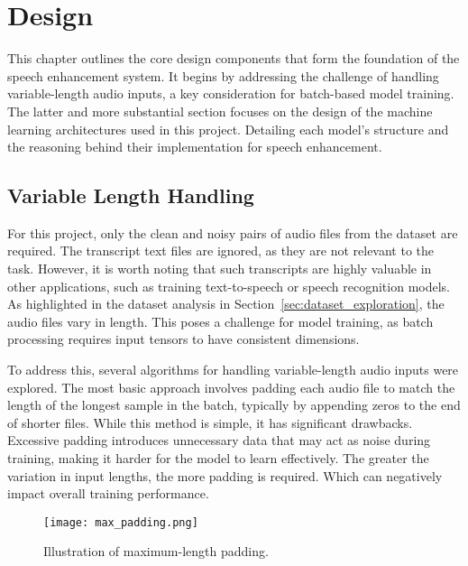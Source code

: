 \graphicspath{{content/chapters/5_design/figures/}}
\chapter{Design}
\label{chp:design}

This chapter outlines the core design components that form the foundation of the speech enhancement system. It begins by addressing the challenge of handling variable-length audio inputs, a key consideration for batch-based model training. The latter and more substantial section focuses on the design of the machine learning architectures used in this project. Detailing each model's structure and the reasoning behind their implementation for speech enhancement.

\section{Variable Length Handling}
\label{sec:variable_length_handling}

For this project, only the clean and noisy pairs of audio files from the dataset are required. The transcript text files are ignored, as they are not relevant to the task. However, it is worth noting that such transcripts are highly valuable in other applications, such as training text-to-speech or speech recognition models. As highlighted in the dataset analysis in Section~\ref{sec:dataset_exploration}, the audio files vary in length. This poses a challenge for model training, as batch processing requires input tensors to have consistent dimensions.

To address this, several algorithms for handling variable-length audio inputs were explored. The most basic approach involves padding each audio file to match the length of the longest sample in the batch, typically by appending zeros to the end of shorter files. While this method is simple, it has significant drawbacks. Excessive padding introduces unnecessary data that may act as noise during training, making it harder for the model to learn effectively. The greater the variation in input lengths, the more padding is required. Which can negatively impact overall training performance.

\begin{figure}[h]
    \centering
    \texttt{[image: max\_padding.png]}
    \caption{\label{fig:max_padding}Illustration of maximum-length padding.}
\end{figure}

